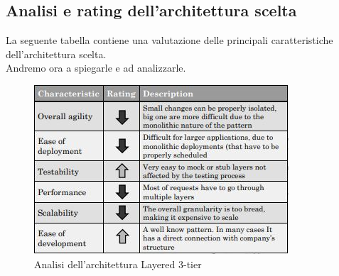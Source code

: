 \subsection{Analisi e rating dell'architettura scelta}
La seguente tabella contiene una valutazione delle principali caratteristiche dell'architettura scelta.\\
Andremo ora a spiegarle e ad analizzarle.
\begin{figure}[h]
	\centering
	\includegraphics[scale=1]{immagini/layered_architecture_analysis}
	\caption{Analisi dell'architettura Layered 3-tier}
\end{figure}
